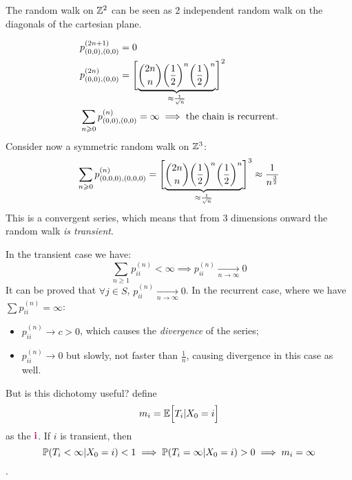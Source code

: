 \documentclass{article}
\begin{document}
	\begin{minipage}{0.45\textwidth}
		The random walk on $\mathbb{Z}^2$ can be seen as 2 independent random walk on the diagonals of the cartesian plane.
	\end{minipage}
	\begin{align*}
		&p_{(0,0),(0,0)}^{(2n+1)}=0\\
		&p_{(0,0),(0,0)}^{(2n)}=\Biggl[\underbrace{\binom{2n}{n}\biggl(\frac{1}{2}\biggr)^n\biggl(\frac{1}{2}\biggr)^n}_{\mathclap{\large\approx \frac{1}{\sqrt{n}}}}\Biggr]^2\\
		&\sum_{n \geqslant 0}p_{(0,0),(0,0)}^{(n)}=\infty\implies\text{the chain is recurrent.}
	\end{align*}
	Consider now a symmetric random walk on $\mathbb{Z}^3$:
	\[
	\sum_{n \geqslant 0}p_{(0,0,0),(0,0,0)}^{(n)}=\Biggl[\underbrace{\binom{2n}{n}\biggl(\frac{1}{2}\biggr)^n\biggl(\frac{1}{2}\biggr)^n}_{\mathclap{\large\approx \frac{1}{\sqrt{n}}}}\Biggr]^3\approx\frac{1}{n^{\frac{3}{2}}}
	\]
	This is a convergent series, which means that from 3 dimensions onward the random walk \textit{is transient}.
	
	In the transient case we have:
	\[
	\sum_{n\geqslant 1}p_{ii}^{(n)}<\infty\implies p_{ii}^{(n)}\xrightarrow[n\rightarrow\infty]{}0
	\]
	It can be proved that $\forall j \in S$, $p_{ii}^{(n)}\xrightarrow[n\rightarrow\infty]{}0$. In the recurrent case, where we have $\sum p_{ii}^{(n)}=\infty$:
	\begin{itemize}
		\item $p_{ii}^{(n)}\rightarrow c>0$, which causes the \textit{divergence} of the series;
		\item  $p_{ii}^{(n)}\rightarrow 0$ but slowly, not faster than $\frac{1}{n}$, causing divergence in this case as well.
	\end{itemize}
	But is this dichotomy useful? define
	\[m_i=\mathbb{E}\Bigl[{T_i|X_0=i}\Bigr]\] as the  $\enf{i}$. If $i$ is transient, then \[\mathbb{P}(T_i<\infty|X_0=i)<1\implies\mathbb{P}(T_i=\infty|X_0=i)>0\implies m_i=\infty\].
	
\end{document}
